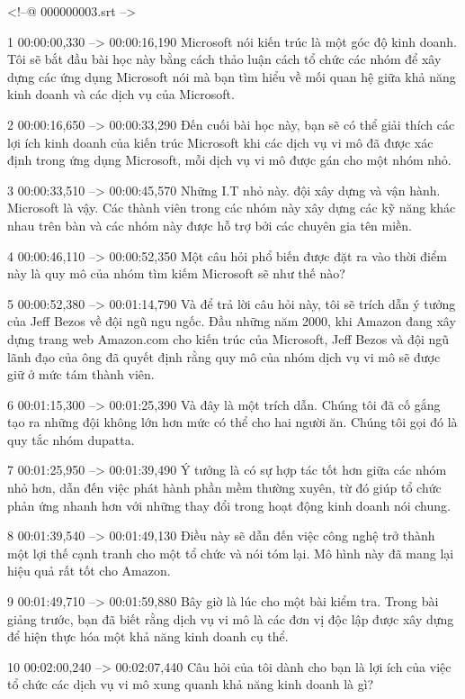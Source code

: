 <!--@ 000000003.srt -->

1
00:00:00,330 --> 00:00:16,190
Microsoft nói kiến ​​trúc là một góc độ kinh doanh. Tôi sẽ bắt đầu bài học này bằng cách thảo luận cách tổ chức các nhóm để xây dựng các ứng dụng Microsoft nói mà bạn tìm hiểu về mối quan hệ giữa khả năng kinh doanh và các dịch vụ của Microsoft.

2
00:00:16,650 --> 00:00:33,290
Đến cuối bài học này, bạn sẽ có thể giải thích các lợi ích kinh doanh của kiến ​​trúc Microsoft khi các dịch vụ vi mô đã được xác định trong ứng dụng Microsoft, mỗi dịch vụ vi mô được gán cho một nhóm nhỏ.

3
00:00:33,510 --> 00:00:45,570
Những I.T nhỏ này.  đội xây dựng và vận hành.  Microsoft là vậy.  Các thành viên trong các nhóm này xây dựng các kỹ năng khác nhau trên bàn và các nhóm này được hỗ trợ bởi các chuyên gia tên miền.

4
00:00:46,110 --> 00:00:52,350
Một câu hỏi phổ biến được đặt ra vào thời điểm này là quy mô của nhóm tìm kiếm Microsoft sẽ như thế nào?

5
00:00:52,380 --> 00:01:14,790
Và để trả lời câu hỏi này, tôi sẽ trích dẫn ý tưởng của Jeff Bezos về đội ngũ ngu ngốc.  Đầu những năm 2000, khi Amazon đang xây dựng trang web Amazon.com cho kiến ​​trúc của Microsoft, Jeff Bezos và đội ngũ lãnh đạo của ông đã quyết định rằng quy mô của nhóm dịch vụ vi mô sẽ được giữ ở mức tám thành viên.

6
00:01:15,300 --> 00:01:25,390
Và đây là một trích dẫn.  Chúng tôi đã cố gắng tạo ra những đội không lớn hơn mức có thể cho hai người ăn.  Chúng tôi gọi đó là quy tắc nhóm dupatta.

7
00:01:25,950 --> 00:01:39,490
Ý tưởng là có sự hợp tác tốt hơn giữa các nhóm nhỏ hơn, dẫn đến việc phát hành phần mềm thường xuyên, từ đó giúp tổ chức phản ứng nhanh hơn với những thay đổi trong hoạt động kinh doanh nói chung.

8
00:01:39,540 --> 00:01:49,130
Điều này sẽ dẫn đến việc công nghệ trở thành một lợi thế cạnh tranh cho một tổ chức và nói tóm lại.  Mô hình này đã mang lại hiệu quả rất tốt cho Amazon.

9
00:01:49,710 --> 00:01:59,880
Bây giờ là lúc cho một bài kiểm tra.  Trong bài giảng trước, bạn đã biết rằng dịch vụ vi mô là các đơn vị độc lập được xây dựng để hiện thực hóa một khả năng kinh doanh cụ thể.

10
00:02:00,240 --> 00:02:07,440
Câu hỏi của tôi dành cho bạn là lợi ích của việc tổ chức các dịch vụ vi mô xung quanh khả năng kinh doanh là gì?

